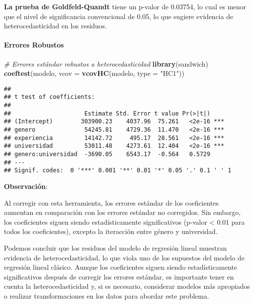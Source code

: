 \documentclass[
]{article}
\newenvironment{Shaded}{\begin{snugshade}}{\end{snugshade}}
\newcommand{\AttributeTok}[1]{\textcolor[rgb]{0.13,0.29,0.53}{#1}}
\newcommand{\CommentTok}[1]{\textcolor[rgb]{0.56,0.35,0.01}{\textit{#1}}}
\newcommand{\FunctionTok}[1]{\textcolor[rgb]{0.13,0.29,0.53}{\textbf{#1}}}
\newcommand{\NormalTok}[1]{#1}
\newcommand{\StringTok}[1]{\textcolor[rgb]{0.31,0.60,0.02}{#1}}
\begin{document}
\textbf{La prueba de Goldfeld-Quandt} tiene un p-valor de 0.03754, lo
cual es menor que el nivel de significancia convencional de 0.05, lo que
sugiere evidencia de heterocedasticidad en los residuos.

\paragraph{Errores Robustos}\label{errores-robustos}

\begin{Shaded}
\begin{Highlighting}[]
\CommentTok{\# Errores estándar robustos a heterocedasticidad}
\FunctionTok{library}\NormalTok{(sandwich)}
\FunctionTok{coeftest}\NormalTok{(modelo, }\AttributeTok{vcov =} \FunctionTok{vcovHC}\NormalTok{(modelo, }\AttributeTok{type =} \StringTok{"HC1"}\NormalTok{))}
\end{Highlighting}
\end{Shaded}

\begin{verbatim}
## 
## t test of coefficients:
## 
##                     Estimate Std. Error t value Pr(>|t|)    
## (Intercept)        303900.23    4037.96  75.261   <2e-16 ***
## genero              54245.81    4729.36  11.470   <2e-16 ***
## experiencia         14142.72     495.17  28.561   <2e-16 ***
## universidad         53011.48    4273.61  12.404   <2e-16 ***
## genero:universidad  -3690.05    6543.17  -0.564   0.5729    
## ---
## Signif. codes:  0 '***' 0.001 '**' 0.01 '*' 0.05 '.' 0.1 ' ' 1
\end{verbatim}

\textbf{Observación}:

Al corregir con esta herramienta, los errores estándar de los
coeficientes aumentan en comparación con los errores estándar no
corregidos. Sin embargo, los coeficientes siguen siendo estadísticamente
significativos (p-valor \textless{} 0.01 para todos los coeficientes),
excepto la iteracción entre género y universidad.

Podemos concluir que los residuos del modelo de regresión lineal
muestran evidencia de heterocedasticidad, lo que viola uno de los
supuestos del modelo de regresión lineal clásico. Aunque los
coeficientes siguen siendo estadísticamente significativos después de
corregir los errores estándar, es importante tener en cuenta la
heterocedasticidad y, si es necesario, considerar modelos más apropiados
o realizar transformaciones en los datos para abordar este problema.
\end{document}
